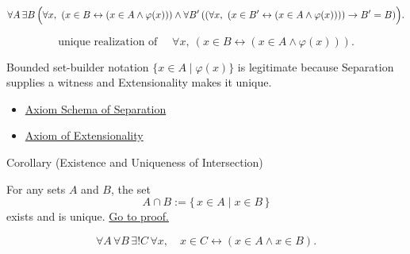 

\begin{remark*}
\[
  \forall A\,\exists B\,
  \Bigl(
  \forall x,\ (x\in B\leftrightarrow(x\in A\wedge\varphi(x)))
  \wedge
  \forall B'\,
  ((\forall x,\ (x\in B'\leftrightarrow(x\in A\wedge\varphi(x))))\to B'=B)
  \Bigr).
\]
\end{remark*}

\begin{remark*}
\[
  \text{unique realization of }\quad
  \forall x,\ (x\in B\leftrightarrow(x\in A\wedge\varphi(x))).
\]
\end{remark*}

\begin{remark*}[Interpretation]
Bounded set-builder notation \(\{x\in A\mid \varphi(x)\}\) is legitimate
because Separation supplies a witness and Extensionality makes it unique.
\end{remark*}

\begin{dependencies}
\begin{itemize}
  \item \hyperref[ax:separation]{Axiom Schema of Separation}
  \item \hyperref[ax:extensionality]{Axiom of Extensionality}
\end{itemize}
\end{dependencies}

\begin{corollarybox}{Corollary (Existence and Uniqueness of Intersection)}
\begin{corollary}\label{cor:intersection-exists-unique}
For any sets $A$ and $B$, the set
\[
  A\cap B:=\{\,x\in A\mid x\in B\,\}
\]
exists and is unique.
\hyperref[prf:intersection-exists-unique]{Go to proof.}
\end{corollary}
\end{corollarybox}



\begin{remark*}
\[
  \forall A\,\forall B\,\exists! C\,\forall x,\quad
  x\in C\leftrightarrow(x\in A\wedge x\in B).
\]
\end{remark*}

